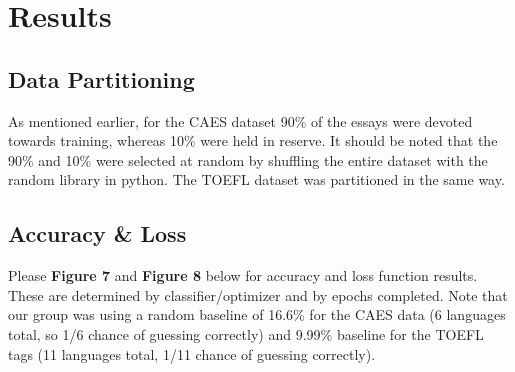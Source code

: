 \documentclass[12pt]{article}
\begin{document}
\section{Results}
\subsection{Data Partitioning}
As mentioned earlier, for the CAES dataset 90\% of the essays were devoted towards training, whereas 10\% were held in reserve. It should be noted that the 90\% and 10\% were selected at random by shuffling the entire dataset with the random library in python. The TOEFL dataset was partitioned in the same way.
\subsection{Accuracy \& Loss}
Please \textbf{Figure 7} and \textbf{Figure 8} below for accuracy and loss function results. These are determined by classifier/optimizer and by epochs completed. Note that our group was using a random baseline of 16.6\% for the CAES data (6 languages total, so 1/6 chance of guessing correctly) and 9.99\% baseline for the TOEFL tags (11 languages total, 1/11 chance of guessing correctly). \\
\end{document}
